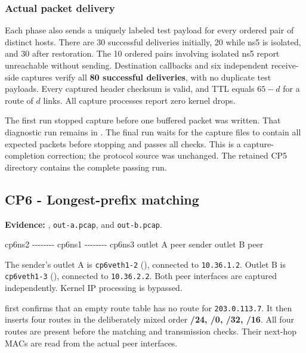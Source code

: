 \documentclass[
  a4paper,
  10pt]{article}
\newenvironment{Shaded}{}{}
\newcommand{\NormalTok}[1]{#1}
\begin{document}
\subsubsection{Actual packet delivery}\label{actual-packet-delivery}

Each phase also sends a uniquely labeled test payload for every ordered
pair of distinct hosts. There are 30 successful deliveries initially, 20
while ns5 is isolated, and 30 after restoration. The 10 ordered pairs
involving isolated ns5 report unreachable without sending. Destination
callbacks and six independent receive-side captures verify all
\textbf{80 successful deliveries}, with no duplicate test payloads.
Every captured header checksum is valid, and TTL equals \(65-d\) for a
route of \(d\) links. All capture processes report zero kernel drops.

The first run stopped capture before one buffered packet was written.
That diagnostic run remains in
{\ttfamily{}}. The final run waits for
the capture files to contain all expected packets before stopping and
passes all checks. This is a capture-completion correction; the protocol
source was unchanged. The retained CP5 directory contains the complete
passing run.

\newpage

\subsection{CP6 - Longest-prefix
matching}\label{cp6---longest-prefix-matching}

\textbf{Evidence:} {\ttfamily{}},
\texttt{out-a.pcap}, and \texttt{out-b.pcap}.

\begin{Shaded}
\begin{Highlighting}[]
\NormalTok{cp6ns2 {-}{-}{-}{-}{-}{-}{-}{-} cp6ns1 {-}{-}{-}{-}{-}{-}{-}{-} cp6ns3}
\NormalTok{  outlet A peer   sender         outlet B peer}
\end{Highlighting}
\end{Shaded}

The sender's outlet A is \texttt{cp6veth1-2}
({\ttfamily{}}), connected to \texttt{10.36.1.2}.
Outlet B is \texttt{cp6veth1-3} ({\ttfamily{}}),
connected to \texttt{10.36.2.2}. Both peer interfaces are captured
independently. Kernel IP processing is bypassed.

{\ttfamily{}} first confirms that an empty route
table has no route for \texttt{203.0.113.7}. It then inserts four routes
in the deliberately mixed order \textbf{/24, /0, /32, /16}. All four
routes are present before the matching and transmission checks. Their
next-hop MACs are read from the actual peer interfaces.
\end{document}
